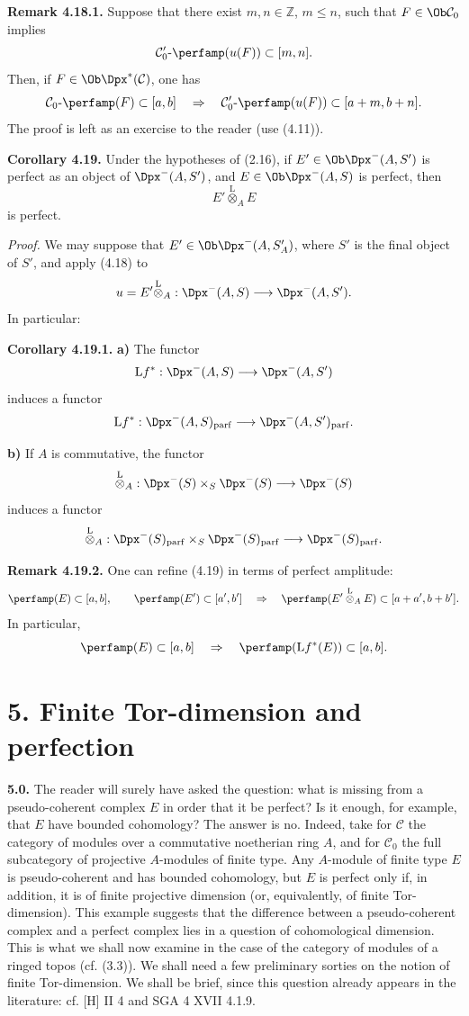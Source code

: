 \textbf{Remark 4.18.1.} Suppose that there exist \(m,n\in\mathbb Z\), \(m\leq n\), such that \(F\in\Ob\mathcal C_0\) implies
\[
  \mathcal C'_0\text{-}\perfamp(u(F))\subset[m,n].
\]
Then, if \(F\in\Ob\Dpx^*(\mathcal C)\), one has
\[
  \mathcal C_0\text{-}\perfamp(F)
  \subset [a,b]
  \quad\Rightarrow\quad
  \mathcal C'_0\text{-}\perfamp(u(F))
  \subset [a+m,b+n].
\]
The proof is left as an exercise to the reader (use (4.11)).

\textbf{Corollary 4.19.} Under the hypotheses of (2.16), if \(E'\in\Ob\Dpx^-(A,S')\) is perfect as an object of \(\Dpx^-(A,S')\), and \(E\in\Ob\Dpx^-(A,S)\) is perfect, then
\[
  E'\overset{\mathrm L}{\otimes}_A E
\]
is perfect.

\emph{Proof.} We may suppose that \(E'\in\Ob\Dpx^-(A,S'_A)\), where \(S'\) is the final object of \(S'\), and apply (4.18) to
\[
  u=E'\overset{\mathrm L}{\otimes}_A:
  \Dpx^-(A,S)\longrightarrow \Dpx^-(A,S').
\]
In particular:

\textbf{Corollary 4.19.1.} \textbf{a)} The functor
\[
  \mathrm L f^*:\Dpx^-(A,S)\longrightarrow \Dpx^-(A,S')
\]
induces a functor
\[
  \mathrm L f^*:\Dpx^-(A,S)_{\mathrm{parf}}
  \longrightarrow
  \Dpx^-(A,S')_{\mathrm{parf}}.
\]

\textbf{b)} If \(A\) is commutative, the functor
\[
  \overset{\mathrm L}{\otimes}_A:
  \Dpx^-(S)\times_S\Dpx^-(S)
  \longrightarrow \Dpx^-(S)
\]
induces a functor
\[
  \overset{\mathrm L}{\otimes}_A:
  \Dpx^-(S)_{\mathrm{parf}}\times_S\Dpx^-(S)_{\mathrm{parf}}
  \longrightarrow \Dpx^-(S)_{\mathrm{parf}}.
\]

\textbf{Remark 4.19.2.} One can refine (4.19) in terms of perfect amplitude:
\[
  \perfamp(E)\subset[a,b],\qquad
  \perfamp(E')\subset[a',b']
  \quad\Rightarrow\quad
  \perfamp(E'\overset{\mathrm L}{\otimes}_A E)\subset[a+a',b+b'].
\]
In particular,
\[
  \perfamp(E)\subset[a,b]
  \quad\Rightarrow\quad
  \perfamp(\mathrm L f^*(E))\subset[a,b].
\]

\section*{5. Finite Tor-dimension and perfection}

\textbf{5.0.} The reader will surely have asked the question: what is missing from a pseudo-coherent complex \(E\) in order that it be perfect? Is it enough, for example, that \(E\) have bounded cohomology? The answer is no. Indeed, take for \(\mathcal C\) the category of modules over a commutative noetherian ring \(A\), and for \(\mathcal C_0\) the full subcategory of projective \(A\)-modules of finite type. Any \(A\)-module of finite type \(E\) is pseudo-coherent and has bounded cohomology, but \(E\) is perfect only if, in addition, it is of finite projective dimension (or, equivalently, of finite Tor-dimension). This example suggests that the difference between a pseudo-coherent complex and a perfect complex lies in a question of cohomological dimension. This is what we shall now examine in the case of the category of modules of a ringed topos (cf. (3.3)). We shall need a few preliminary sorties on the notion of finite Tor-dimension. We shall be brief, since this question already appears in the literature: cf. [H] II 4 and SGA 4 XVII 4.1.9.

